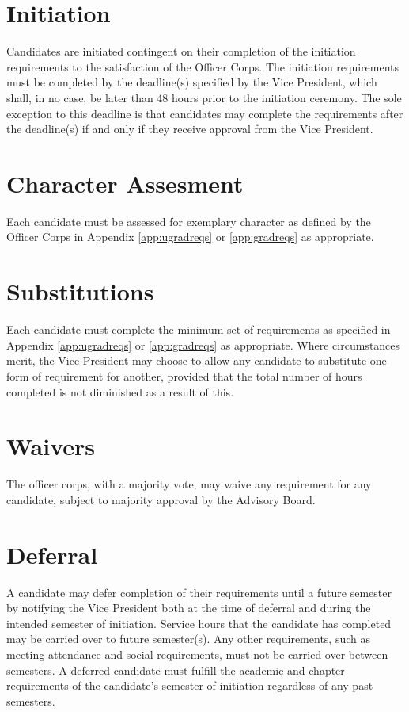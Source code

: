 
\section{Initiation}
Candidates are initiated contingent on their completion of the initiation requirements to the satisfaction of the Officer Corps. The initiation requirements must be completed by the deadline(s) specified by the Vice President, which shall, in no case, be later than 48 hours prior to the initiation ceremony. The sole exception to this deadline is that candidates may complete the requirements after the deadline(s) if and only if they receive approval from the Vice President.

\section{Character Assesment}
Each candidate must be assessed for exemplary character as defined by the Officer Corps in Appendix \ref{app:ugradreqs} or \ref{app:gradreqs} as appropriate.

\section{Substitutions}
Each candidate must complete the minimum set of requirements as specified in Appendix \ref{app:ugradreqs} or \ref{app:gradreqs} as appropriate. Where circumstances merit, the Vice President may choose to allow any candidate to substitute one form of requirement for another, provided that the total number of hours completed is not diminished as a result of this.

\section{Waivers}
The officer corps, with a majority vote, may waive any requirement for any candidate, subject to majority approval by the Advisory Board.

\section{Deferral}
A candidate may defer completion of their requirements until a future semester by notifying the Vice President both at the time of deferral and during the intended semester of initiation. Service hours that the candidate has completed may be carried over to future semester(s). Any other requirements, such as meeting attendance and social requirements, must not be carried over between semesters. A deferred candidate must fulfill the academic and chapter requirements of the candidate's semester of initiation regardless of any past semesters.

